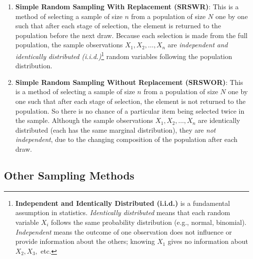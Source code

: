\documentclass[twoside]{book}
\begin{document}
\begin{enumerate}
    \item \textbf{Simple Random Sampling With Replacement (SRSWR)}: This is a method of selecting a sample of size \( n \) from a population of size \( N \) one by one such that after each stage of selection, the element is returned to the population before the next draw. Because each selection is made from the full population, the sample observations \( X_1, X_2, \dots, X_n \) are \textit{independent and identically distributed (i.i.d.)}\footnote{%
    \textbf{Independent and Identically Distributed (i.i.d.)} is a fundamental assumption in statistics. \textit{Identically distributed} means that each random variable \( X_i \) follows the same probability distribution (e.g., normal, binomial). \textit{Independent} means the outcome of one observation does not influence or provide information about the others; knowing \( X_1 \) gives no information about \( X_2, X_3, \) etc.
} random variables following the population distribution.

    \item \textbf{Simple Random Sampling Without Replacement (SRSWOR)}: This is a method of selecting a sample of size \( n \) from a population of size \( N \) one by one such that after each stage of selection, the element is not returned to the population. So there is no chance of a particular item being selected twice in the sample. Although the sample observations \( X_1, X_2, \dots, X_n \) are identically distributed (each has the same marginal distribution), they are \textit{not independent}, due to the changing composition of the population after each draw.
\end{enumerate}


\subsection{Other Sampling Methods}
\end{document}
